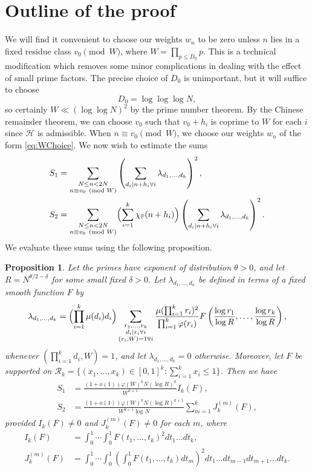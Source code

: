 \documentclass[12pt,a4paper]{amsart}
\theoremstyle{plain}
\newtheorem{prpstn}[thrm]{Proposition}
\numberwithin{sblmm}{thrm}
\numberwithin{equation}{section}
\renewcommand{\phi}{\varphi}
\begin{document}
\section{Outline of the proof}\label{sctn:Outline}
We will find it convenient to choose our weights $w_n$ to be zero unless $n$ lies in a fixed residue class $v_0\pmod{W}$, where $W=\prod_{p\le D_0}p$. This is a technical modification which removes some minor complications in dealing with the effect of small prime factors. The precise choice of $D_0$ is unimportant, but it will suffice to choose
\begin{equation}D_0=\log\log\log{N},\end{equation}
so certainly $W\ll (\log\log{N})^2$ by the prime number theorem. By the Chinese remainder theorem, we can choose $v_0$ such that $v_0+h_i$ is coprime to $W$ for each $i$ since $\mathcal{H}$ is admissible. When $n\equiv v_0\pmod{W}$, we choose our weights $w_n$ of the form \eqref{eq:WChoice}. We now wish to estimate the sums
\begin{align}
S_1&=\sum_{\substack{N\le n<2N\\n \equiv v_0\pmod{W}}}\left(\sum_{d_i|n+h_i\forall i}\lambda_{d_1,\dotsc,d_k}\right)^2,\\
S_2&=\sum_{\substack{N\le n<2N\\n \equiv v_0\pmod{W}}}\Bigl(\sum_{i=1}^k\chi_{\mathbb{P}}(n+h_i)\Bigr)\left(\sum_{d_i|n+h_i\forall i}\lambda_{d_1,\dotsc,d_k}\right)^2.
\end{align}
We evaluate these sums using the following proposition.
\begin{prpstn}\label{prpstn:MainProp}
 Let the primes have exponent of distribution $\theta>0$, and let $R=N^{\theta/2-\delta}$ for some small fixed $\delta>0$. Let $\lambda_{d_1,\dotsc,d_k}$ be defined in terms of a fixed smooth function $F$ by
\[\lambda_{d_1,\dotsc,d_k}=\Bigl(\prod_{i=1}^k\mu(d_i)d_i\Bigr)\sum_{\substack{r_1,\dotsc,r_k\\d_i|r_i\forall i\\(r_i,W)=1\forall i}}\frac{\mu(\prod_{i=1}^kr_i)^2}{\prod_{i=1}^k\phi(r_i)}F\left(\frac{\log{r_1}}{\log{R}},\dotsc,\frac{\log{r_k}}{\log{R}}\right),\]
whenever $(\prod_{i=1}^kd_i,W)=1$, and let $\lambda_{d_1,\dotsc,d_k}=0$ otherwise. Moreover, let $F$ be supported on $\mathcal{R}_k=\{(x_1,\dotsc,x_k)\in[0,1]^k:\sum_{i=1}^kx_i\le 1\}$.
Then we have
\begin{align*}
S_1&=\frac{(1+o(1)) \phi(W)^k N (\log{R})^k}{W^{k+1}} I_k(F),\\
S_2&=\frac{(1+o(1)) \phi(W)^k N (\log{R})^{k+1}}{W^{k+1}\log{N}}\sum_{m=1}^kJ_k^{(m)}(F),
\end{align*}
provided $I_k(F)\ne 0$ and $J_k^{(m)}(F)\ne 0$ for each $m$, where
\begin{align*}
I_k(F)&=\int_0^1\dotsi \int_0^1 F(t_1,\dotsc, t_k)^2dt_1\dotsc dt_k,\\
J_k^{(m)}(F)&=\int_0^1\dotsi \int_0^1 \left(\int_0^1 F(t_1,\dotsc,t_k)dt_m\right)^2 dt_1\dotsc dt_{m-1} dt_{m+1}\dotsc dt_k.
\end{align*}
\end{prpstn}
\end{document}
